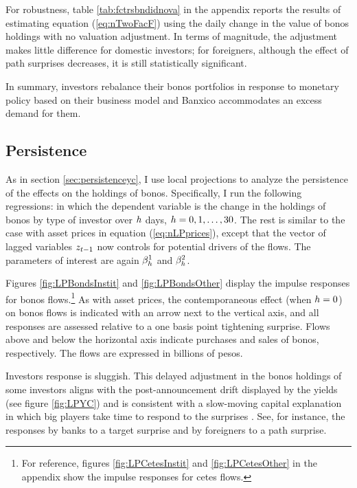 {For robustness, table \ref{tab:fctrsbndidnova} in the appendix reports the results of estimating equation (\ref{eq:nTwoFacF}) using the daily change in the value of bonos holdings with no valuation adjustment. In terms of magnitude, the adjustment makes little difference for domestic investors; for foreigners, although the effect of path surprises decreases, it is still statistically significant. 

In summary, investors rebalance their bonos portfolios in response to monetary policy based on their business model and Banxico accommodates an excess demand for them. 

\subsection{Persistence} \label{sec:flowsdypersist}
As in section \ref{sec:persistenceyc}, I use local projections to analyze the persistence of the effects on the holdings of bonos. 
Specifically, I run the following regressions:
\noindent in which the dependent variable is the change in the holdings of bonos by type of investor over \(h\) days, \(h = 0, 1, \ldots, 30\). 
The rest is similar to the case with asset prices in equation (\ref{eq:nLPprices}), except that the vector of lagged variables \(z_{t-1}\) now controls for potential drivers of the flows. 
The parameters of interest are again \(\beta^{1}_{h}\) and \(\beta^{2}_{h}\). 

Figures \ref{fig:LPBondsInstit} and \ref{fig:LPBondsOther} display the impulse responses for bonos flows.\footnote{For reference, figures \ref{fig:LPCetesInstit} and \ref{fig:LPCetesOther} in the appendix show the impulse responses for cetes flows.} As with asset prices, the contemporaneous effect (when \(h = 0\)) on bonos flows is indicated with an arrow next to the vertical axis, and all responses are assessed relative to a one basis point tightening surprise. Flows above and below the horizontal axis indicate purchases and sales of bonos, respectively. The flows are expressed in billions of pesos. 

%



Investors response is sluggish. 
This delayed adjustment in the bonos holdings of some investors aligns with the post-announcement drift displayed by the yields (see figure \ref{fig:LPYC}) and is consistent with a slow-moving capital explanation in which big players take time to respond to the surprises \parencite{BrooksKatzLustig:2019}. 
See, for instance, the responses by banks to a target surprise and by foreigners to a path surprise. 

}
